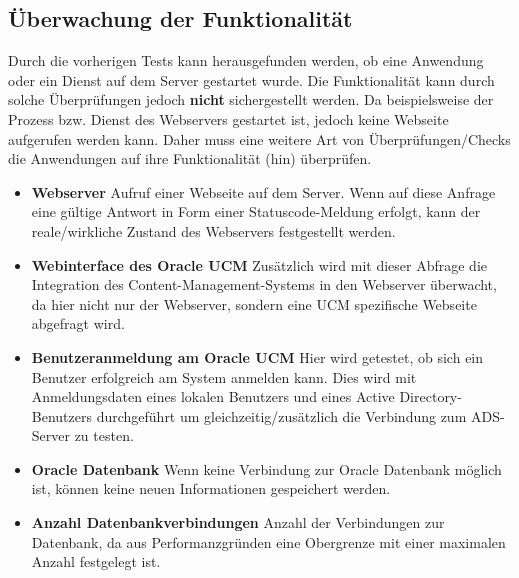 \subsection{Überwachung der Funktionalität}
\label{funztest}
Durch die vorherigen Tests kann herausgefunden werden, ob eine Anwendung oder ein Dienst auf dem Server gestartet wurde.
Die Funktionalität kann durch solche Überprüfungen jedoch \textbf{nicht} sichergestellt werden.
Da beispielsweise der Prozess bzw. Dienst des Webservers gestartet ist, jedoch keine Webseite aufgerufen werden kann.
Daher muss eine weitere Art von Überprüfungen/Checks die Anwendungen auf ihre Funktionalität (hin) überprüfen.

\begin{itemize}
\item \textbf{Webserver} Aufruf einer Webseite auf dem Server. Wenn auf diese Anfrage eine gültige Antwort in Form einer Statuscode-Meldung erfolgt, kann der reale/wirkliche Zustand des Webservers festgestellt werden.

\item \textbf{Webinterface des Oracle UCM} Zusätzlich wird mit dieser Abfrage die Integration des Content-Management-Systems in den Webserver überwacht, da hier nicht nur der Webserver, sondern eine UCM spezifische Webseite abgefragt wird.

\item \textbf{Benutzeranmeldung am Oracle UCM} Hier wird getestet, ob sich ein Benutzer erfolgreich am System anmelden kann.
Dies wird mit Anmeldungsdaten eines lokalen Benutzers und eines Active Directory-Benutzers durchgeführt um gleichzeitig/zusätzlich die Verbindung zum ADS-Server zu testen.

\item \textbf{Oracle Datenbank} Wenn keine Verbindung zur Oracle Datenbank möglich ist, können keine neuen Informationen gespeichert werden. 


\item \textbf{Anzahl Datenbankverbindungen} Anzahl der Verbindungen zur Datenbank, da aus Performanzgründen eine Obergrenze mit einer maximalen Anzahl festgelegt ist.
\end{itemize}


